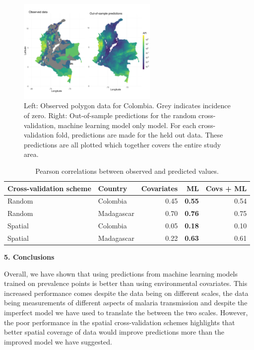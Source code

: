 \documentclass[11pt]{article}
\begin{document}
\begin{figure}
\centering
\includegraphics[trim={0 40mm 0 100mm}, width = 0.6\textwidth]{figs/col_obs_pred_map_ml.png} %
\caption{
  Left: Observed polygon data for Colombia. Grey indicates incidence of zero. Right: Out-of-sample predictions for the random cross-validation, machine learning model only model. For each cross-validation fold, predictions are made for the held out data. These predictions are all plotted which together covers the entire study area.
}
\label{randompredobspointfacet}
\end{figure}


\begin{table}
\caption{Pearson correlations between observed and predicted values. }
\centering
\begin{tabular}{llrrr}
Cross-validation scheme & Country &  Covariates &  ML &  Covs + ML \\
\hline 
 Random &  Colombia &  0.45 &  \textbf{0.55} &  0.54 \\
 Random &  Madagascar &  0.70 &  \textbf{0.76} &  0.75 \\
 Spatial &  Colombia &  0.05 &  \textbf{0.18} &  0.10 \\
 Spatial &  Madagascar &  0.22 &  \textbf{0.63} &  0.61 
\end{tabular}
\label{t:results}
\end{table}



{\bf 5. Conclusions}

Overall, we have shown that using predictions from machine learning models trained on prevalence points is better than using environmental covariates.
This increased performance comes despite the data being on different scales, the data being measurements of different aspects of malaria transmission and despite the imperfect model we have used to translate the between the two scales.
However, the poor performance in the spatial cross-validation schemes highlights that better spatial coverage of data would improve predictions more than the improved model we have suggested.
\end{document}
